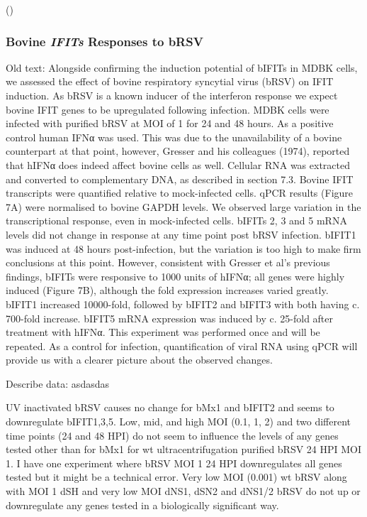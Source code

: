 (\cite{McClurkin1974ComparisonVirus})


\subsubsection{Bovine \textit{IFITs} Responses to bRSV} \label{Bovine \textit{IFITs} Responses to bRSV}
Old text:
Alongside confirming the induction potential of bIFITs in MDBK cells, we assessed the effect of bovine respiratory syncytial virus (bRSV) on IFIT induction. As bRSV is a known inducer of the interferon response we expect bovine IFIT genes to be upregulated following infection. MDBK cells were infected with purified bRSV at MOI of 1 for 24 and 48 hours. As a positive control human IFNα was used. This was due to the unavailability of a bovine counterpart at that point, however, Gresser and his colleagues (1974), reported that hIFNα does indeed affect bovine cells as well. Cellular RNA was extracted and converted to complementary DNA, as described in section 7.3. Bovine IFIT transcripts were quantified relative to mock-infected cells. qPCR results (Figure 7A) were normalised to bovine GAPDH levels. We observed large variation in the transcriptional response, even in mock-infected cells. bIFITs 2, 3 and 5 mRNA levels did not change in response at any time point post bRSV infection. bIFIT1 was induced at 48 hours post-infection, but the variation is too high to make firm conclusions at this point. However, consistent with Gresser et al’s previous findings, bIFITs were responsive to 1000 units of hIFNα; all genes were highly induced (Figure 7B), although the fold expression increases varied greatly. bIFIT1 increased 10000-fold, followed by bIFIT2 and bIFIT3 with both having c. 700-fold increase. bIFIT5 mRNA expression was induced by c. 25-fold after treatment with hIFNα. This experiment was performed once and will be repeated. As a control for infection, quantification of viral RNA using qPCR will provide us with a clearer picture about the observed changes.

Describe data: \newline
asdasdas

UV inactivated bRSV causes no change for bMx1 and bIFIT2 and seems to downregulate bIFIT1,3,5. Low, mid, and high MOI (0.1, 1, 2) and two different time points (24 and 48 HPI) do not seem to influence the levels of any genes tested other than for bMx1 for wt ultracentrifugation purified bRSV 24 HPI MOI 1. I have one experiment where bRSV MOI 1 24 HPI downregulates all genes tested but it might be a technical error. 
Very low MOI (0.001) wt bRSV along with MOI 1 dSH and very low MOI dNS1, dSN2 and dNS1/2 bRSV do not up or downregulate any genes tested in a biologically significant way.

